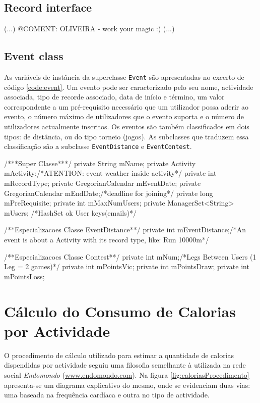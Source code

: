 \documentclass[a4paper,10pt]{report}
\begin{document}
\section{Record interface}
\label{sec:interface}
(...)
@COMENT: OLIVEIRA - work your magic :)
(...)

\section{Event class}
\label{sec:event}
As variáveis de instância da superclasse \verb!Event! são apresentadas no excerto de código \ref{code:event}.
Um evento pode ser caracterizado pelo seu nome, actividade associada, tipo de recorde associado, 
data de início e término, um valor correspondente a um pré-requisito necessário que um utilizador possa aderir ao evento, 
o número máximo de utilizadores que o evento suporta e o número de utilizadores actualmente inscritos.
Os eventos são também classificados em dois tipos: de distância, ou do tipo torneio (jogos).
As subclasses que traduzem essa classificação são a subclasse \verb!EventDistance! e \verb!EventContest!.

\begin{code}[caption=Variáveis de instância da superclasse Event e subclasses respectivas (src/model/event)., label=code:event]
/***Super Classe***/
private String mName;
private Activity mActivity;/*ATENTION: event weather inside activity*/
private int mRecordType;
private GregorianCalendar mEventDate;
private GregorianCalendar mEndDate;/*deadline for joining*/
private long mPreRequisite;
private int mMaxNumUsers;
private ManagerSet<String> mUsers; /*HashSet ok User keys(emails)*/

/**Especializacoes Classe EventDistance**/
private int mEventDistance;/*An event is about a Activity with its record type, like: Run 10000m*/

/**Especializacoes Classe Contest**/
private int mNum;/*Legs Between Users (1 Leg = 2 games)*/
private int mPointsVic;
private int mPointsDraw;
private int mPointsLoss;
\end{code}

\chapter{Cálculo do Consumo de Calorias por Actividade}
\label{cap:calorias}
O procedimento de cálculo utilizado para estimar a quantidade de calorias dispendidas por actividade seguiu uma filosofia semelhante à utilizada 
na rede social \emph{Endomondo} (\url{www.endomondo.com}). 
Na figura \ref{fig:caloriasProcedimento} apresenta-se um diagrama explicativo do mesmo, onde se evidenciam duas vias: uma baseada na frequência 
cardíaca e outra no tipo de actividade.
\end{document}
